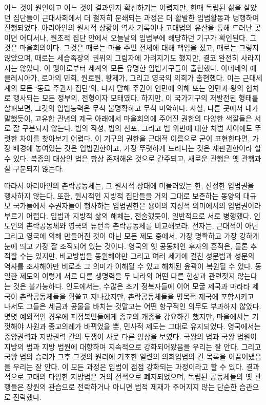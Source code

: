 어느 것이 원인이고 어느 것이 결과인지 확신하기는 어렵지만,
한때 독립된 삶을 살았던 집단들이 근대사회에서 더 철저히 분쇄되는 과정은
더 활발한 입법활동과 병행하여 진행되었다.
아리아인의 원시적 상황이 역사 기록이나 고대법의 유산을 통해
드러난 곳이면 어디서나,
원초적 집단 안에서 오늘날의 입법부에 해당하던 기구가 확인된다.
그것은 마을회의이다.
그것은 때로는 마을 주민 전체에 대해 책임을 졌고,
때로는 그렇지 않았으며,
때로는 세습족장의 권위의 그림자에 가려지기도 했지만,
결코 완전히 사라지지는 않았다.
이 맹아로부터 세계의 모든 유명한 입법기구들이 출현했다.
아테네의 에클레시아가, 로마의 민회, 원로원, 황제가,
그리고 영국의 의회가 출현했다.
이는 근대세계의 모든 
`동료 주권자 집단'의,
다시 말해 주권이 인민에 의해 또는 인민과 왕의 협치로 행사되는
모든 정부의, 전형이자 모태였다.
하지만,
이 국가기구의 저발전된 형태를 살펴보면,
그것의 입법능력은 무척 불명확하고 무척 미약하다.
사실, 다른 곳에서 내가 말했듯이,
고유한 관념의 제국 아래에서
마을회의에 주어진 권한의 다양한 색깔들은 서로 잘 구분되지 않는다.
법의 작성, 법의 선포, 그리고 법 위반에 대한 처벌 사이에도
뚜렷한 차이를 찾아보기 어렵다.
이 기구의 권한을 근대적 이름으로 굳이 표현한다면,
가장 배경에 놓여있는 것은 입법권한이고,
가장 뚜렷하게 드러나는 것은 재판권한이라 할 수 있다.
복종의 대상인 법은 항상 존재해온 것으로 간주되고,
새로운 관행은 옛 관행과 잘 구분되지 않는다.

따라서 아리아인의 촌락공동체는, 그 원시적 상태에 머물러있는 한,
진정한 입법권을 행사하지 않는다.
또한,
원시적인 지방적 집단들을 거의 그대로 보존하는
동양의 대규모 국가들에서 주권자들이 행사하는 입법권한은
용어의 지성적 의미에서의 입법권이라 부르기 어렵다.
입법과 지방적 삶의 해체는, 전술했듯이, 일반적으로 서로 병행했다.
인도인의 촌락공동체와 영국의 튜턴족 촌락공동체를 비교해보라.
전자는, 근대적이 아닌 그리고 영국에 의해 만들어진 것이 아닌
모든 제도 중에서,
가장 명확하고 가장 강하게 눈에 띄고 가장 잘 조직되어 있는 것이다.
영국의 옛 공동체인 후자의 흔적은, 물론 추적할 수는 있지만,
비교방법을 동원해야만 그리고
여러 세기에 걸친 성문법과 성문의 역사를 조사해야만
비로소 그 의미가 이해될 수 있고
해체된 윤곽이 복원될 수 있다.
동일한 제도의 이렇게 서로 다른 생명력을 두 나라의 어떤 다른 현상과
관련짓지 않는다는 것은 불가능하다.
인도에서는,
수많은 초기 정복자들에 이어
모굴 제국과 마라타 제국이
촌락공동체들을 휩쓸고 지나갔지만,
촌락공동체들을 명목적 제국에 포함시키고 나서도
그들은 세금과 공물을 바치는 것말고는 어떤 항구적인 의무도 부과하지 않았다.
몇몇 예외적인 경우에
피정복민들에게 종교의 개종을 강요하긴 했지만,
마을에서는 기껏해야 사원과 종교의례가 바뀌었을 뿐,
민사적 제도는 그대로 유지되었다.
영국에서는 중앙권력과 지방권력 간의 투쟁이 사뭇 다른 양상을 보였다.
국왕의 법과 국왕 법원이 지방의 법과 지방 법원에 대항하여
지속적으로 강화되어왔음을 우리는 잘 안다.
그리고 국왕 법의 승리가 그후 그것의 원리에 기초한
일련의 의회입법의 긴 목록을 이끌어냈음을 우리는 잘 안다.
이 모든 과정은 입법이 점점 강화되는 과정이라고 할 수 있다.
결과적으로 고대의 다양한 지방법은 거의 전적으로 폐지되었으며,
독립된 공동체들의 옛 관행들은 장원의 관습으로 전락하거나
아니면 법적 제재가 주어지지 않는 단순한 습관으로 전락했다.

